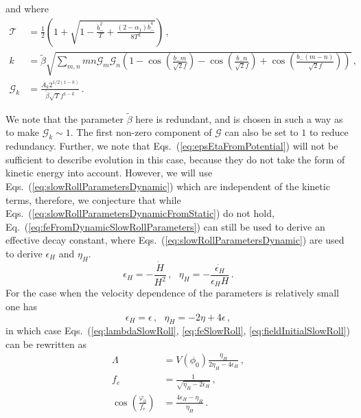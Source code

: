 \documentclass[12pt]{article}
\begin{document}
and where
\begin{align} %
  \mathcal{T} &= \frac{1}{2} \left(
      1
    + \sqrt{1 - \frac{{\dot b}_-^2}{T} + \frac{\left(2 - \alpha_1\right){\dot b}_-^4}{8 T^2}}
  \right)\,,\\
  k &= \tilde\beta \sqrt{\sum_{m, n} m n \mathcal{G}_m \mathcal{G}_n \left(
      1
    - \cos\left(\frac{b_- m}{\sqrt{2} f}\right)
    - \cos\left(\frac{b_- n}{\sqrt{2} f}\right)
    + \cos\left(\frac{b_- \left(m - n\right)}{\sqrt{2} f}\right)
  \right)}\,,\\
  \mathcal{G}_k &= \frac{A_k 2^{1 / 2 \left(1 - k\right)}}{\tilde\beta \sqrt{T} f^{1 - k}}\,.
\end{align}

We note that the parameter $\tilde\beta$ here is redundant, and is chosen in such a way as to make $\mathcal{G}_k \sim 1$.
The first non-zero component of $\mathcal{G}$ can also be set to $1$ to reduce redundancy.
Further, we note that Eqs.~(\ref{eq:epsEtaFromPotential}) will not be sufficient to describe evolution in this case, because they do not take the form of kinetic energy into account.
However, we will use Eqs.~(\ref{eq:slowRollParametersDynamic}) which are independent of the kinetic terms, therefore, we conjecture that while Eqs.~(\ref{eq:slowRollParametersDynamicFromStatic}) do not hold, Eq.~(\ref{eq:feFromDynamicSlowRollParameters}) can still be used to derive an effective decay constant, where Eqs.~(\ref{eq:slowRollParametersDynamic}) are used to derive $\epsilon_H$ and $\eta_H$.
\begin{equation} \label{eq:slowRollParametersDynamic}
  \epsilon_H = -\frac{\dot H}{H^2}\,,
  ~~~ \eta_H = -\frac{\dot{\epsilon_H}}{\epsilon_H H}\,.
\end{equation}
For the case when the velocity dependence of the parameters is relatively small one has
\begin{equation} \label{eq:slowRollParametersDynamicFromStatic}
  \epsilon_H = \epsilon\,,
  ~~~ \eta_H = -2 \eta + 4 \epsilon\,,
\end{equation}
in which case Eqs.~(\ref{eq:lambdaSlowRoll}, \ref{eq:feSlowRoll}, \ref{eq:fieldInitialSlowRoll}) can be rewritten as
\begin{align} %
  \Lambda &= V\left(\phi_0\right) \frac{\eta_H}{2 \eta_H - 4 \epsilon_H}\,,\\
  \label{eq:feFromDynamicSlowRollParameters}
  f_e &= \frac{1}{\sqrt{\eta_H - 2 \epsilon_H}}\,,\\
  \cos\left(\frac{\varphi_0}{f_e}\right) &= \frac{4 \epsilon_H - \eta_H}{\eta_H}\,.
\end{align}
\end{document}
